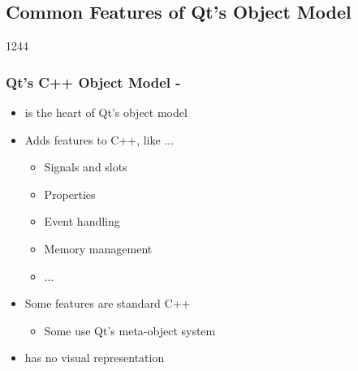 \subsection{Common Features of Qt's Object Model}

\begin{slide}{1244}
  \frametitle{Qt's C++ Object Model - }
  \begin{itemize}
  \item {} is the heart of Qt's object model
  \item Adds features to C++, like ...
    \begin{itemize}
    \item Signals and slots
    \item Properties
    \item Event handling
    \item Memory management
    \item ...
   \end{itemize}
 \item Some features are standard C++
    \begin{itemize}
    \item Some use Qt's meta-object system 
    \end{itemize}
  \item {} has no visual representation

 \end{itemize}
\end{slide}


